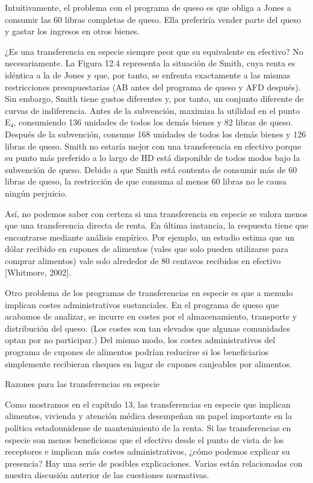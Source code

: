 \documentclass[10pt,a4paper]{article}
\begin{document}
Intuitivamente, el problema con el programa de queso es que obliga a Jones a consumir las 60 libras completas de queso. Ella preferiría vender parte del queso y gastar los ingresos en otros bienes.

¿Es una transferencia en especie siempre peor que su equivalente en efectivo? No necesariamente. La Figura 12.4 representa la situación de Smith, cuya renta es idéntica a la de Jones y que, por tanto, se enfrenta exactamente a las mismas restricciones presupuestarias (AB antes del programa de queso y AFD después). Sin embargo, Smith tiene gustos diferentes y, por tanto, un conjunto diferente de curvas de indiferencia. Antes de la subvención, maximiza la utilidad en el punto E₄, consumiendo 136 unidades de todos los demás bienes y 82 libras de queso. Después de la subvención, consume 168 unidades de todos los demás bienes y 126 libras de queso. Smith no estaría mejor con una transferencia en efectivo porque su punto más preferido a lo largo de HD está disponible de todos modos bajo la subvención de queso. Debido a que Smith está contento de consumir más de 60 libras de queso, la restricción de que consuma al menos 60 libras no le causa ningún perjuicio.

Así, no podemos saber con certeza si una transferencia en especie se valora menos que una transferencia directa de renta. En última instancia, la respuesta tiene que encontrarse mediante análisis empírico. Por ejemplo, un estudio estima que un dólar recibido en cupones de alimentos (vales que solo pueden utilizarse para comprar alimentos) vale solo alrededor de 80 centavos recibidos en efectivo [Whitmore, 2002].

Otro problema de los programas de transferencias en especie es que a menudo implican costes administrativos sustanciales. En el programa de queso que acabamos de analizar, se incurre en costes por el almacenamiento, transporte y distribución del queso. (Los costes son tan elevados que algunas comunidades optan por no participar.) Del mismo modo, los costes administrativos del programa de cupones de alimentos podrían reducirse si los beneficiarios simplemente recibieran cheques en lugar de cupones canjeables por alimentos.

Razones para las transferencias en especie

Como mostramos en el capítulo 13, las transferencias en especie que implican alimentos, vivienda y atención médica desempeñan un papel importante en la política estadounidense de mantenimiento de la renta. Si las transferencias en especie son menos beneficiosas que el efectivo desde el punto de vista de los receptores e implican más costes administrativos, ¿cómo podemos explicar su presencia? Hay una serie de posibles explicaciones. Varias están relacionadas con nuestra discusión anterior de las cuestiones normativas.
\end{document}
